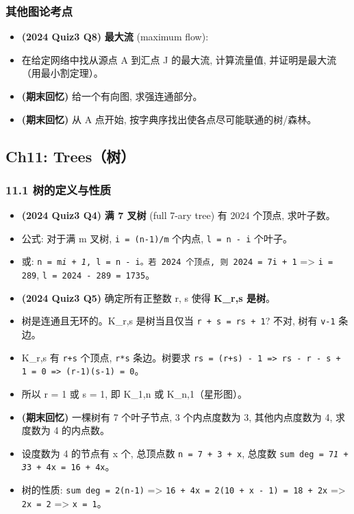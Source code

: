 \documentclass[10pt,a4paper,openany]{ctexbook}
\theoremstyle{definition}
\theoremstyle{remark}
\begin{document}
\subsubsection{其他图论考点}

\begin{itemize}
\item \textbf{(2024 Quiz3 Q8)} \textbf{最大流} (maximum flow):
\item 在给定网络中找从源点 A 到汇点 J 的最大流, 计算流量值, 并证明是最大流（用最小割定理）。

\item \textbf{(期末回忆)} 给一个有向图, 求强连通部分。
\item \textbf{(期末回忆)} 从 A 点开始, 按字典序找出使各点尽可能联通的树/森林。

\end{itemize}

\vspace{-2pt}

\subsection{Ch11: Trees（树）}

\subsubsection{11.1 树的定义与性质}

\begin{itemize}
\item \textbf{(2024 Quiz3 Q4)} \textbf{满 7 叉树} (full 7-ary tree) 有 2024 个顶点, 求叶子数。
\item 公式: 对于满 m 叉树, \texttt{i = (n-1)/m} 个内点, \texttt{l = n - i} 个叶子。
\item 或: \texttt{n = m\textit{i + 1}, \texttt{l = n - i}。若 2024 个顶点, 则 \texttt{2024 = 7}i + 1} => \texttt{i = 289}, \texttt{l = 2024 - 289 = 1735}。

\item \textbf{(2024 Quiz3 Q5)} 确定所有正整数 r, s 使得 \textbf{K\_{r,s} 是树}。
\item 树是连通且无环的。K\_{r,s} 是树当且仅当 \texttt{r + s = rs + 1}? 不对, 树有 \texttt{v-1} 条边。
\item K\_{r,s} 有 \texttt{r+s} 个顶点, \texttt{r*s} 条边。树要求 \texttt{rs = (r+s) - 1 => rs - r - s + 1 = 0 => (r-1)(s-1) = 0}。
\item 所以 r = 1 或 s = 1, 即 K\_{1,n} 或 K\_{n,1}（星形图）。

\item \textbf{(期末回忆)} 一棵树有 7 个叶子节点, 3 个内点度数为 3, 其他内点度数为 4, 求度数为 4 的内点数。
\item 设度数为 4 的节点有 x 个, 总顶点数 \texttt{n = 7 + 3 + x}, 总度数 \texttt{sum deg = 7\textit{1 + 3}3 + 4x = 16 + 4x}。
\item 树的性质: \texttt{sum deg = 2(n-1)} => \texttt{16 + 4x = 2(10 + x - 1) = 18 + 2x} => \texttt{2x = 2} => \texttt{x = 1}。

\end{itemize}
\end{document}
